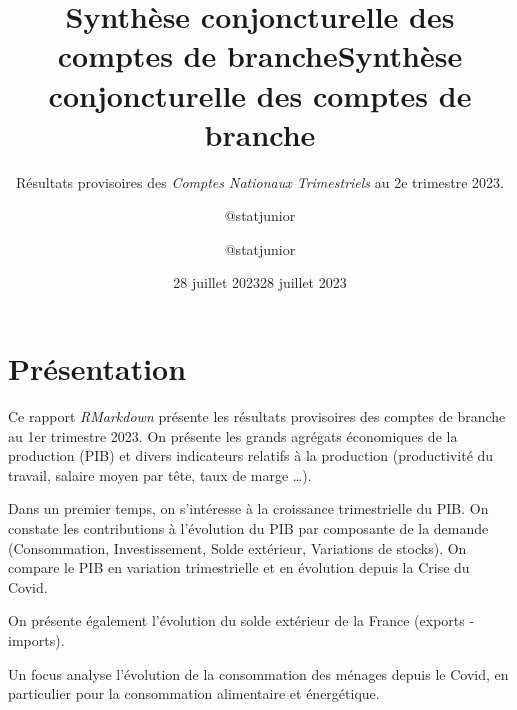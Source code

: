\documentclass[
  paper=a4,
  ,captions=tableheading
]{scrartcl}
\title{Synthèse conjoncturelle des comptes de branche}
\subtitle{Résultats provisoires des \emph{Comptes Nationaux
Trimestriels} au 2e trimestre 2023.}
\author{@statjunior}
\date{28 juillet 2023}
\title{Synthèse conjoncturelle des comptes de branche}
\author{@statjunior}
\date{28 juillet 2023}
\begin{document}
\begin{titlepage}
\afterpage{\restorepagecolor}
\newcommand{\colorRule}[3][black]{\textcolor[HTML]{#1}{\rule{#2}{#3}}}
\end{titlepage}
\restoregeometry
{} 




\hypertarget{pruxe9sentation}{%
\section{Présentation}\label{pruxe9sentation}}

Ce rapport \emph{RMarkdown} présente les résultats provisoires des
comptes de branche au 1er trimestre 2023. On présente les grands
agrégats économiques de la production (PIB) et divers indicateurs
relatifs à la production (productivité du travail, salaire moyen par
tête, taux de marge \ldots).

Dans un premier temps, on s'intéresse à la croissance trimestrielle du
PIB. On constate les contributions à l'évolution du PIB par composante
de la demande (Consommation, Investissement, Solde extérieur, Variations
de stocks). On compare le PIB en variation trimestrielle et en évolution
depuis la Crise du Covid.

On présente également l'évolution du solde extérieur de la France
(exports - imports).

Un focus analyse l'évolution de la consommation des ménages depuis le
Covid, en particulier pour la consommation alimentaire et énergétique.
\end{document}
